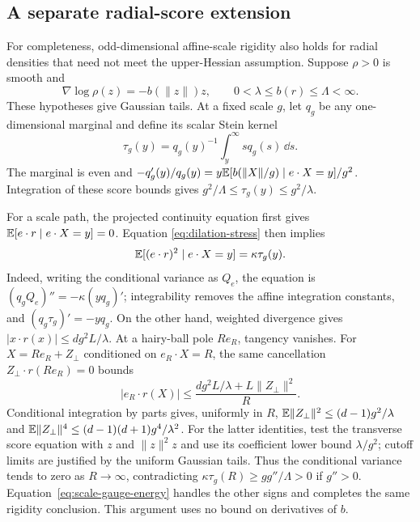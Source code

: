\subsection{A separate radial-score extension}

For completeness, odd-dimensional affine-scale rigidity also holds for
radial densities that need not meet the upper-Hessian assumption.
Suppose $\rho>0$ is smooth and
\[
 \nabla\log\rho(z)=-b(\|z\|)z,\qquad
 0<\lambda\le b(r)\le\Lambda<\infty.
\]
These hypotheses give Gaussian tails.  At a fixed scale $g$, let $q_g$
be any one-dimensional marginal and define its scalar Stein kernel
\[
 \tau_g(y)=q_g(y)^{-1}\int_y^\infty s q_g(s)\,\dd s.
\]
The marginal is even and
$-q_g'(y)/q_g(y)=y\mathbb E[b(\|X\|/g)\mid e\cdot X=y]/g^2$.
Integration of these score bounds gives
$g^2/\Lambda\le\tau_g(y)\le g^2/\lambda$.

For a scale path, the projected continuity equation first gives
$\mathbb E[e\cdot r\mid e\cdot X=y]=0$.  Equation
\eqref{eq:dilation-stress} then implies
\[
 \mathbb E[(e\cdot r)^2\mid e\cdot X=y]=\kappa\tau_g(y).
\]
Indeed, writing the conditional variance as $Q_e$, the equation is
$(q_gQ_e)''=-\kappa(yq_g)'$; integrability removes the affine integration
constants, and $(q_g\tau_g)'=-yq_g$.
On the other hand, weighted divergence gives
$|x\cdot r(x)|\le dg^2L/\lambda$.
At a hairy-ball pole $Re_R$, tangency vanishes.  For
$X=Re_R+Z_\perp$ conditioned on $e_R\cdot X=R$, the same cancellation
$Z_\perp\cdot r(Re_R)=0$ bounds
\[
 |e_R\cdot r(X)|\le
 \frac{dg^2L/\lambda+L\|Z_\perp\|^2}{R}.
\]
Conditional integration by parts gives, uniformly in $R$,
$\mathbb E\|Z_\perp\|^2\le(d-1)g^2/\lambda$ and
$\mathbb E\|Z_\perp\|^4\le(d-1)(d+1)g^4/\lambda^2$.
For the latter identities, test the transverse score equation with
$z$ and $\|z\|^2z$ and use its coefficient lower bound
$\lambda/g^2$; cutoff limits are justified by the uniform Gaussian
tails.  Thus the conditional variance tends to zero as $R\to\infty$,
contradicting $\kappa\tau_g(R)\ge gg''/\Lambda>0$ if $g''>0$.
Equation~\eqref{eq:scale-gauge-energy} handles the other signs and
completes the same rigidity conclusion.  This argument uses no bound
on derivatives of $b$.
